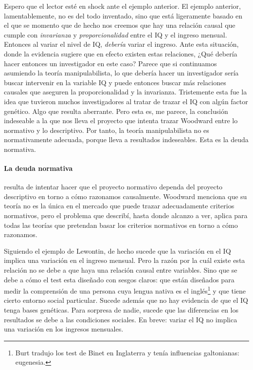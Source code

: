 {{Espero que el lector esté en shock ante el ejemplo anterior.
El ejemplo anterior, lamentablemente, no es del todo
inventado, sino que está ligeramente basado en el que se
momento que de hecho nos creemos que hay una relación causal
que cumple con \emph{invarianza} y \emph{proporcionalidad}
entre el IQ y el ingreso mensual. Entonces al variar el
nivel de IQ, \emph{debería} variar el ingreso. Ante esta
situación, donde la evidencia sugiere que en efecto existen
estas relaciones, ¿Qué debería hacer entonces un
investigador en este caso? Parece que si continuamos
asumiendo la teoría manipulabilista, lo que debería hacer un
investigador sería buscar intervenir en la variable IQ y
puede entonces buscar más relaciones causales que aseguren
la proporcionalidad y la invarianza. Tristemente esta fue la
idea que tuvieron muchos investigadores al tratar de trazar
el IQ con algún factor genético. Algo que resulta aberrante.
Pero esta es, me parece, la conclusión indeseable a la que
nos lleva el proyecto que intenta trazar Woodward entre lo
normativo y lo descriptivo. Por tanto, la teoría
manipulabilista no es normativamente adecuada, porque lleva
a resultados indeseables. Esta es la deuda normativa.


\paragraph{La deuda normativa} resulta de intentar hacer que
el proyecto normativo dependa del proyecto descriptivo en
torno a cómo razonamos causalmente. Woodward menciona que su
teoría no es la única en el mercado que puede trazar
adecuadamente criterios normativos, pero el problema que
describí, hasta donde alcanzo a ver, aplica para todas las
teorías que pretendan basar los criterios normativos en
torno a cómo razonamos.

Siguiendo el ejemplo de Lewontin, de hecho sucede que la
variación en el IQ implica una variación en el ingreso
mensual. Pero la razón por la cuál existe esta relación no
se debe a que haya una relación causal entre variables. Sino
que se debe a cómo el test esta diseñado con sesgos claros:
que están diseñados para medir la comprensión de una persona
cuya lengua nativa es el inglés\footnote{
  Burt tradujo los test de Binet en Inglaterra y tenía
  influencias galtonianas: eugenesia.
}
y que tiene cierto entorno social particular. Sucede además
que no hay evidencia de que el IQ tenga bases genéticas.
Para sorpresa de nadie, sucede que las diferencias en los
resultados se debe a las condiciones sociales. En
breve: variar el IQ no implica una variación en los ingresos
mensuales.

}}
